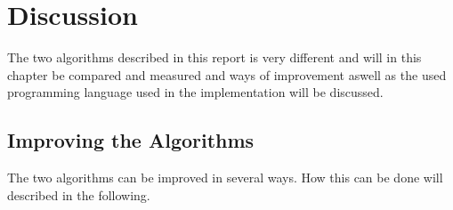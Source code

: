 \chapter{Discussion}
\emptyTop{}
The two algorithms described in this report is very different and will in this chapter be compared and measured and ways of improvement aswell as the used programming language used in the implementation will be discussed. 




\section{Improving the Algorithms}
The two algorithms can be improved in several ways. How this can be done will described in the following. 



